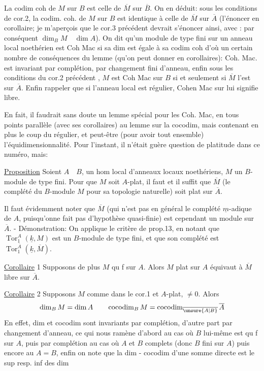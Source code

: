 La codim coh de $M$ sur $B$ est celle de $\overline M$ sur $\overline B$. On en déduit: sous les conditions de cor.2, la codim. coh. de $M$ sur $B$ est identique à celle de $\overline M$ sur $\overline A$ (l'énoncer en corollaire; je m'aperçois que le cor.3 précédent devrait s'énoncer ainsi, avec : par conséquent $\dim_B M\quad\dim A$). On dit qu'un module de type fini sur un anneau local noethérien est Coh Mac si sa dim est égale à sa codim coh d'où un certain nombre de conséquences du lemme (qu'on peut donner en corollaires): Coh. Mac. est invariant par complétion, par changement fini d'anneau, enfin sous les conditions du cor.2 précédent , $M$ est Coh Mac sur $B$ si et seulement si $\overline M$ l'est sur $\overline A$. Enfin rappeler que si l'anneau local est régulier, Cohen Mac sur lui signifie libre.

En fait, il faudrait sans doute un lemme spécial pour les Coh. Mac, en tous points parallèle (avec ses corollaires) au lemme sur la cocodim, mais contenant en plus le coup du régulier, et peut-être (pour avoir tout ensemble) l'équidimensionnalité. Pour l'instant, il n'était guère question de platitude dans ce numéro, mais:

\uline{Proposition} Soient $A\quad B$,  un hom local d'anneaux locaux noethériens, $M$ un $B$-module de type fini. Pour que $M$ soit $A$-plat, il faut et il suffit que $\overline M$ (le complété du $B$-module $M$ pour sa topologie naturelle) soit plat sur $\overline A$.

Il faut évidemment noter que $\overline M$ (qui n'est pas en général le complété $\underline m$-adique de $A$, puisqu'onne fait pas d'hypothèse quasi-finie) est cependant un module sur $\overline A$. - Démonstration: On applique le critère de prop.13, en notant que $\operatorname{Tor}^{A}_{1}(\underline k,M)$ est un $B$-module de type fini, et que son complété est $\operatorname{Tor}^{\overline A}_{1}(\underline k,\overline M)$.

\uline{Corollaire} 1 Supposons de plus $M$ qu f sur $A$. Alors $M$ plat sur $A$ équivaut à $\overline M$ libre sur $\overline A$.

\uline{Corollaire} 2 Supposons $M$ comme dans le cor.1 et $A$-plat, $\ne 0$. Alors
\[
\dim_B M=\dim A\qquad \operatorname{cocodim}_{B}M=\operatorname{cocodim}_{\overline{\unsure{A|B}}}\overline A
\]
En effet, dim et cocodim sont invariants par complétion, d'autre part par changement  d'anneau, ce qui nous ramène d'abord au cas où $B$ lui-même est qu f sur $A$, puis par complétion au cas où $A$ et $B$ complets (donc $B$ fini sur $A$) puis encore au $A=B$, enfin on note que la dim - cocodim d'une somme directe est le sup resp. inf des dim 

